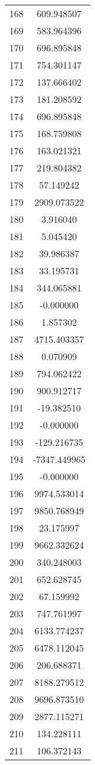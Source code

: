 \documentclass[12pt]{article}
\begin{document}
\begin{longtable}{@{}cc@{}}
168 & 609.948507 \\
169 & 583.964396 \\
170 & 696.895848 \\
171 & 754.301147 \\
172 & 137.666402 \\
173 & 181.208592 \\
174 & 696.895848 \\
175 & 168.759808 \\
176 & 163.021321 \\
177 & 219.804382 \\
178 & 57.149242 \\
179 & 2909.073522 \\
180 & 3.916040 \\
181 & 5.045420 \\
182 & 39.986387 \\
183 & 33.195731 \\
184 & 344.065881 \\
185 & -0.000000 \\
186 & 1.857302 \\
187 & 4715.403357 \\
188 & 0.070909 \\
189 & 794.062422 \\
190 & 900.912717 \\
191 & -19.382510 \\
192 & -0.000000 \\
193 & -129.216735 \\
194 & -7347.449965 \\
195 & -0.000000 \\
196 & 9974.533014 \\
197 & 9850.768949 \\
198 & 23.175997 \\
199 & 9662.332624 \\
200 & 340.248003 \\
201 & 652.628745 \\
202 & 67.159992 \\
203 & 747.761997 \\
204 & 6133.774237 \\
205 & 6478.112045 \\
206 & 206.688371 \\
207 & 8188.279512 \\
208 & 9696.873510 \\
209 & 2877.115271 \\
210 & 134.228111 \\
211 & 106.372143 \\

\end{longtable}
\end{document}
